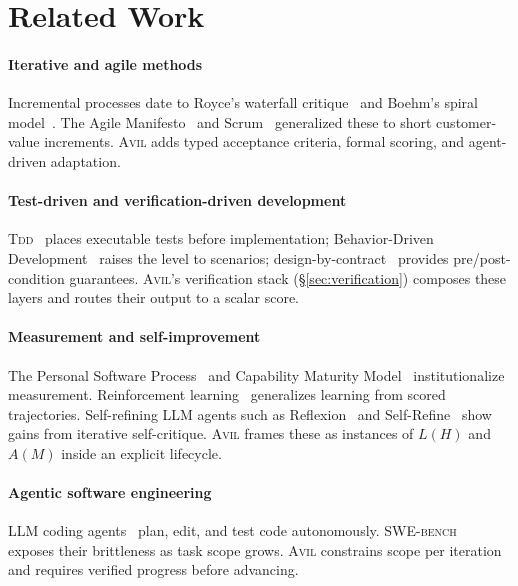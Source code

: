 \documentclass[10pt,twocolumn,letterpaper]{article}
\theoremstyle{definition}
\theoremstyle{plain}
\newcommand{\AVIL}{\textsc{Avil}}
\newcommand{\TDD}{\textsc{Tdd}}
\begin{document}
\section{Related Work}\label{sec:related}

\paragraph{Iterative and agile methods}
Incremental processes date to Royce's waterfall
critique~\citep{royce1970managing} and Boehm's spiral
model~\citep{boehm1988spiral}. The Agile
Manifesto~\citep{beck2001agile} and Scrum~\citep{schwaber2002scrum}
generalized these to short customer-value increments. \AVIL{} adds
typed acceptance criteria, formal scoring, and agent-driven adaptation.

\paragraph{Test-driven and verification-driven development}
\TDD{}~\citep{beck2002tdd} places executable tests before
implementation; Behavior-Driven Development~\citep{north2006bdd}
raises the level to scenarios; design-by-contract~\citep{meyer1992contracts}
provides pre/post-condition guarantees. \AVIL{}'s verification stack
(\S\ref{sec:verification}) composes these layers and routes their
output to a scalar score.

\paragraph{Measurement and self-improvement}
The Personal Software Process~\citep{humphrey1995psp} and Capability
Maturity Model~\citep{paulk1993cmm} institutionalize measurement.
Reinforcement learning~\citep{sutton2018rl} generalizes learning from
scored trajectories. Self-refining LLM agents such as
Reflexion~\citep{shinn2023reflexion} and
Self-Refine~\citep{madaan2023selfrefine} show gains from iterative
self-critique. \AVIL{} frames these as instances of $L(H)$ and $A(M)$
inside an explicit lifecycle.

\paragraph{Agentic software engineering}
LLM coding agents~\citep{yang2024sweagent,wang2024agentsurvey} plan,
edit, and test code autonomously. \textsc{SWE-bench}~\citep{jimenez2024swebench}
exposes their brittleness as task scope grows. \AVIL{} constrains
scope per iteration and requires verified progress before advancing.
\end{document}
